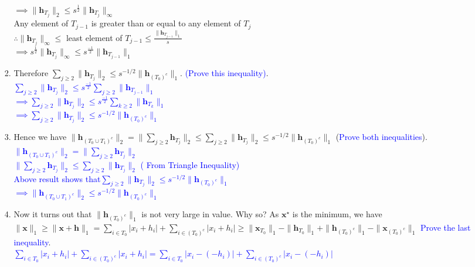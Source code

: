 \documentclass[11pt]{article}
\begin{document}
\begin{enumerate}
\begin{enumerate}
\begin{enumerate}
{$\implies \|\mathbf{h}_{T_j}\|_2 \leq s^\frac{1}{2}\|\mathbf{h}_{T_j}\|_\infty$\\
Any element of $T_{j-1}$ is greater than or equal to any element of $T_j$\\
$\therefore \|\mathbf{h}_{T_j}\|_\infty \leq$ least element of $T_{j-1} \leq \frac{\|\mathbf{h}_{T_{j-1}}\|_1}{s}$\\
$\implies s^\frac{1}{2}\|\mathbf{h}_{T_j}\|_\infty \leq s^\frac{-1}{2}\|\mathbf{h}_{T_{j-1}}\|_1$}
\item Therefore $\sum_{j \geq 2}\|\mathbf{h}_{T_j}\|_2 \leq s^{-1/2} \|\mathbf{h}_{(T_0)^c}\|_1$. \textcolor{blue}{(Prove this inequality)}.\\ 
\textcolor{blue}{$\sum_{j \geq 2}\|\mathbf{h}_{T_j}\|_2 \leq s^\frac{-1}{2}\sum_{j \geq 2}\|\mathbf{h}_{T_{j-1}}\|_1$\\
$\implies \sum_{j \geq 2}\|\mathbf{h}_{T_j}\|_2 \leq s^\frac{-1}{2}\sum_{k \geq 2}\|\mathbf{h}_{T_k}\|_1$\\
$\implies \sum_{j \geq 2}\|\mathbf{h}_{T_j}\|_2 \leq s^{-1/2} \|\mathbf{h}_{(T_0)^c}\|_1$}
\item Hence we have $\|\mathbf{h}_{(T_0 \cup T_1)^c}\|_2 = \|\sum_{j \geq 2} \mathbf{h}_{T_j}\|_2 \leq \sum_{j \geq 2} \|\mathbf{h}_{T_j}\|_2 \leq s^{-1/2} \|\mathbf{h}_{(T_0)^c}\|_1$ (\textcolor{blue}{Prove both inequalities}).\\
\textcolor{blue}{$\|\mathbf{h}_{(T_0 \cup T_1)^c}\|_2 = \|\sum_{j \geq 2} \mathbf{h}_{T_j}\|_2$\\
$\|\sum_{j \geq 2} \mathbf{h}_{T_j}\|_2 \leq \sum_{j \geq 2} \|\mathbf{h}_{T_j}\|_2$ ( From Triangle Inequality)\\
Above result shows that$\sum_{j \geq 2} \|\mathbf{h}_{T_j}\|_2 \leq s^{-1/2} \|\mathbf{h}_{(T_0)^c}\|_1$\\
$\implies \|\mathbf{h}_{(T_0 \cup T_1)^c}\|_2 \leq s^{-1/2} \|\mathbf{h}_{(T_0)^c}\|_1$}
\item Now it turns out that $\|\mathbf{h}_{(T_0)^c}\|_1$ is not very large in value. Why so? As $\mathbf{x}^{\star}$ is the minimum, we have $\|\mathbf{x}\|_1 \geq \|\mathbf{x}+\mathbf{h}\|_1 = \sum_{i \in T_0} |x_i + h_i| + \sum_{i \in {(T_0)}^c} |x_i + h_i| \geq \|\mathbf{x}_{T_0}\|_1 - \|\mathbf{h}_{T_0}\|_1 + \|\mathbf{h}_{{(T_0)}^c}\|_1 - \|\mathbf{x}_{{(T_0)^c}}\|_1$ \textcolor{blue}{Prove the last inequality}. \\
\textcolor{blue}{$\sum_{i \in T_0} |x_i + h_i| + \sum_{i \in {(T_0)}^c} |x_i + h_i| = \sum_{i \in T_0} |x_i - (-h_i)| + \sum_{i \in {(T_0)}^c} |x_i -(- h_i)|$\\
}
\end{enumerate}
\end{enumerate}
\end{enumerate}
\end{document}
